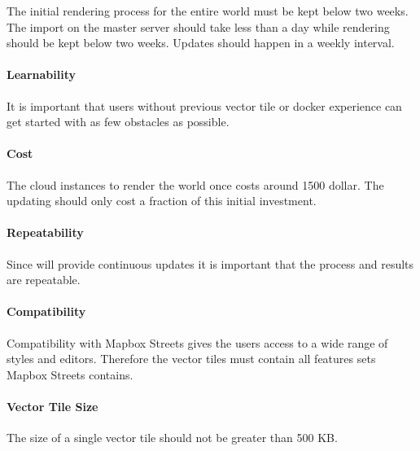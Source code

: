 The initial rendering process for the entire world must be kept below two weeks. The import on the master server should take less than a day while rendering should be kept below two weeks.
Updates should happen in a weekly interval.

\paragraph{Learnability}

It is important that users without previous vector tile or docker experience can get started with as few obstacles as possible.

\paragraph{Cost}

The cloud instances to render the world once costs around 1500 dollar. The updating should only cost a fraction of this initial investment.

\paragraph{Repeatability}

Since \osmvt{} will provide continuous updates it is important that the process and results are repeatable.

\paragraph{Compatibility}

Compatibility with Mapbox Streets gives the users access
to a wide range of styles and editors. Therefore the vector tiles must contain
all features sets Mapbox Streets contains.

\paragraph{Vector Tile Size}

The size of a single vector tile should not be greater than 500 KB.
